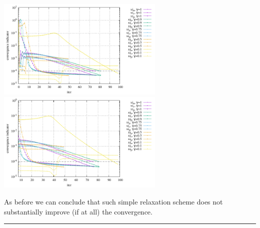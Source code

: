 \begin{center}
\includegraphics[width=8cm]{python_codes/fieldstone_50/results/conv_uvp.pdf}
\includegraphics[width=8cm]{python_codes/fieldstone_50/results/conv_uvp_zoom.pdf}
\end{center}

As before we can conclude that such simple relaxation scheme does not substantially 
improve (if at all) the convergence.

\par\noindent\rule{\textwidth}{0.4pt}

\vspace{.5cm}

\begin{center}
\end{center}






